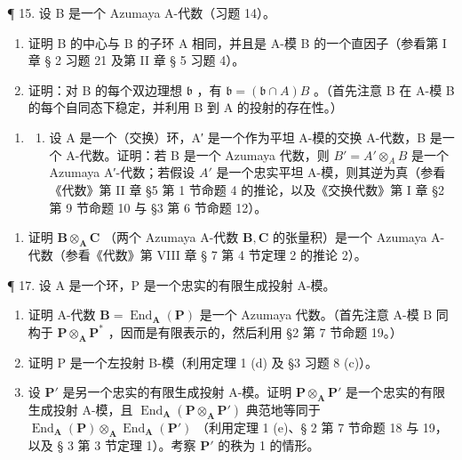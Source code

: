 ¶ 15. 设 B 是一个 Azumaya A-代数（习题 14）。

\begin{enumerate}
\def\labelenumi{(\alph{enumi})}
\item
  证明 B 的中心与 B 的子环 A 相同，并且是 A-模 B 的一个直因子（参看第 I 章 § 2 习题 21 及第 II 章 § 5 习题 4）。
\item
  证明：对 B 的每个双边理想 \(\mathfrak{b}\) ，有 \(\mathfrak{b} = (\mathfrak{b} \cap A)B\) 。（首先注意 B 在 A-模 B 的每个自同态下稳定，并利用 B 到 A 的投射的存在性。）
\end{enumerate}

\begin{enumerate}
\def\labelenumi{\arabic{enumi}.}
\setcounter{enumi}{15}
\tightlist
\item
  \begin{enumerate}
  \def\labelenumii{(\alph{enumii})}
  \tightlist
  \item
    设 A 是一个（交换）环，A′ 是一个作为平坦 A-模的交换 A-代数，B 是一个 A-代数。证明：若 B 是一个 Azumaya 代数，则 \(B' = A' \otimes_{A} B\) 是一个 Azumaya A′-代数；若假设 \(A'\) 是一个忠实平坦 A-模，则其逆为真（参看《代数》第 II 章 §5 第 1 节命题 4 的推论，以及《交换代数》第 I 章 §2 第 9 节命题 10 与 §3 第 6 节命题 12）。
  \end{enumerate}
\end{enumerate}

\begin{enumerate}
\def\labelenumi{(\alph{enumi})}
\setcounter{enumi}{1}
\tightlist
\item
  证明 \(\mathbf{B} \otimes_{\mathbf{A}} \mathbf{C}\) （两个 Azumaya A-代数 \(\mathbf{B}, \mathbf{C}\) 的张量积）是一个 Azumaya A-代数（参看《代数》第 VIII 章 § 7 第 4 节定理 2 的推论 2）。
\end{enumerate}

¶ 17. 设 A 是一个环，P 是一个忠实的有限生成投射 A-模。

\begin{enumerate}
\def\labelenumi{(\alph{enumi})}
\item
  证明 A-代数 \(\mathbf{B} = \operatorname{End}_{\mathbf{A}}(\mathbf{P})\) 是一个 Azumaya 代数。（首先注意 A-模 B 同构于 \(\mathbf{P} \otimes_{\mathbf{A}} \mathbf{P}^*\) ，因而是有限表示的，然后利用 §2 第 7 节命题 19。）
\item
  证明 P 是一个左投射 B-模（利用定理 1 (d) 及 §3 习题 8 (c)）。
\item
  设 \(\mathbf{P}'\) 是另一个忠实的有限生成投射 A-模。证明 \(\mathbf{P} \otimes_{\mathbf{A}} \mathbf{P}'\) 是一个忠实的有限生成投射 A-模，且 \(\operatorname{End}_{\mathbf{A}}(\mathbf{P} \otimes_{\mathbf{A}} \mathbf{P}')\) 典范地等同于 \(\operatorname{End}_{\mathbf{A}}(\mathbf{P}) \otimes_{\mathbf{A}} \operatorname{End}_{\mathbf{A}}(\mathbf{P}')\) （利用定理 1 (e)、§ 2 第 7 节命题 18 与 19，以及 § 3 第 3 节定理 1）。考察 \(\mathbf{P}'\) 的秩为 1 的情形。
\end{enumerate}

